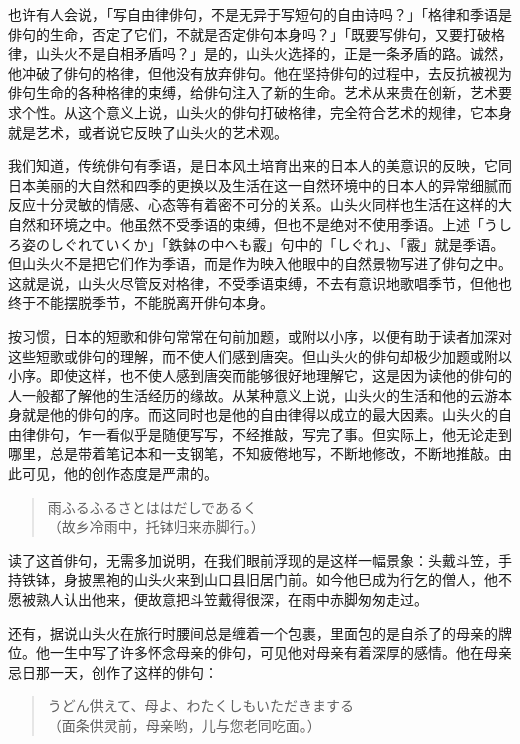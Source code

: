 {也许有人会说，「写自由律俳句，不是无异于写短句的自由诗吗？」「格律和季语是俳句的生命，否定了它们，不就是否定俳句本身吗？」「既要写俳句，又要打破格律，山头火不是自相矛盾吗？」是的，山头火选择的，正是一条矛盾的路。诚然，他冲破了俳句的格律，但他没有放弃俳句。他在坚持俳句的过程中，去反抗被视为俳句生命的各种格律的束缚，给俳句注入了新的生命。艺术从来贵在创新，艺术要求个性。从这个意义上说，山头火的俳句打破格律，完全符合艺术的规律，它本身就是艺术，或者说它反映了山头火的艺术观。

我们知道，传统俳句有季语，是日本风土培育出来的日本人的美意识的反映，它同日本美丽的大自然和四季的更换以及生活在这一自然环境中的日本人的异常细腻而反应十分灵敏的情感、心态等有着密不可分的关系。山头火同样也生活在这样的大自然和环境之中。他虽然不受季语的束缚，但也不是绝对不使用季语。上述「{\FM うしろ姿のしぐれていくか}」「{\FM 鉄鉢の中へも霰}」句中的「{\FM しぐれ}」、「{\FM 霰}」就是季语。但山头火不是把它们作为季语，而是作为映入他眼中的自然景物写进了俳句之中。这就是说，山头火尽管反对格律，不受季语束缚，不去有意识地歌唱季节，但他也终于不能摆脱季节，不能脱离开俳句本身。

按习惯，日本的短歌和俳句常常在句前加题，或附以小序，以便有助于读者加深对这些短歌或俳句的理解，而不使人们感到唐突。但山头火的俳句却极少加题或附以小序。即使这样，也不使人感到唐突而能够很好地理解它，这是因为读他的俳句的人一般都了解他的生活经历的缘故。从某种意义上说，山头火的生活和他的云游本身就是他的俳句的序。而这同时也是他的自由律得以成立的最大因素。山头火的自由律俳句，乍一看似乎是随便写写，不经推敲，写完了事。但实际上，他无论走到哪里，总是带着笔记本和一支钢笔，不知疲倦地写，不断地修改，不断地推敲。由此可见，他的创作态度是严肃的。

\begin{quote}
    {\FM 雨ふるふるさとははだしであるく}\\
    （故乡冷雨中，托钵归来赤脚行。）
\end{quote}

读了这首俳句，无需多加说明，在我们眼前浮现的是这样一幅景象：头戴斗笠，手持铁钵，身披黑袍的山头火来到山口县旧居门前。如今他巳成为行乞的僧人，他不愿被熟人认出他来，便故意把斗笠戴得很深，在雨中赤脚匆匆走过。

还有，据说山头火在旅行时腰间总是缠着一个包裹，里面包的是自杀了的母亲的牌位。他一生中写了许多怀念母亲的俳句，可见他对母亲有着深厚的感情。他在母亲忌日那一天，创作了这样的俳句：

\begin{quote}
    {\FM うどん供えて、母よ、わたくしもいただきまする}\\
    （面条供灵前，母亲哟，儿与您老同吃面。\footnotemark[1]）
\end{quote}

}
